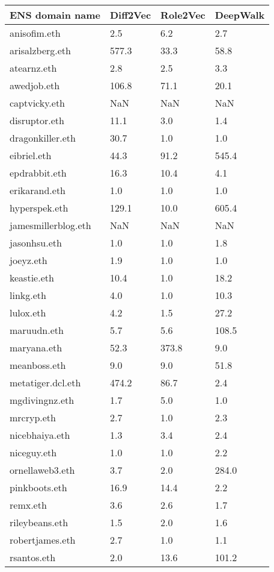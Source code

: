 \documentclass[12pt,a4paper,titlepage,oneside,english]{article}
\begin{document}
\begin{table}[h!]
\scriptsize
  \centering
  \begin{tabular}{llll}
    \hline
	\textbf{ENS domain name} & \textbf{Diff2Vec} & \textbf{Role2Vec} & \textbf{DeepWalk} \\
	\hline
	anisofim.eth & 2.5 & 6.2 & 2.7 \\
	arisalzberg.eth & 577.3 & 33.3 & 58.8 \\
	atearnz.eth & 2.8 & 2.5 & 3.3 \\
	awedjob.eth & 106.8 & 71.1 & 20.1 \\
	captvicky.eth & NaN & NaN & NaN \\
	disruptor.eth & 11.1 & 3.0 & 1.4 \\
	dragonkiller.eth & 30.7 & 1.0 & 1.0 \\
	eibriel.eth & 44.3 & 91.2 & 545.4 \\
	epdrabbit.eth & 16.3 & 10.4 & 4.1 \\
	erikarand.eth & 1.0 & 1.0 & 1.0 \\
	hyperspek.eth & 129.1 & 10.0 & 605.4 \\
	jamesmillerblog.eth & NaN & NaN & NaN \\
	jasonhsu.eth & 1.0 & 1.0 & 1.8 \\
	joeyz.eth & 1.9 & 1.0 & 1.0 \\
	keastie.eth & 10.4 & 1.0 & 18.2 \\
	linkg.eth & 4.0 & 1.0 & 10.3 \\
	lulox.eth & 4.2 & 1.5 & 27.2 \\
	maruudn.eth & 5.7 & 5.6 & 108.5 \\
	maryana.eth & 52.3 & 373.8 & 9.0 \\
	meanboss.eth & 9.0 & 9.0 & 51.8 \\
	metatiger.dcl.eth & 474.2 & 86.7 & 2.4 \\
	mgdivingnz.eth & 1.7 & 5.0 & 1.0 \\
	mrcryp.eth & 2.7 & 1.0 & 2.3 \\
	nicebhaiya.eth & 1.3 & 3.4 & 2.4 \\
	niceguy.eth & 1.0 & 1.0 & 2.2 \\
	ornellaweb3.eth & 3.7 & 2.0 & 284.0 \\
	pinkboots.eth & 16.9 & 14.4 & 2.2 \\
	remx.eth & 3.6 & 2.6 & 1.7 \\
	rileybeans.eth & 1.5 & 2.0 & 1.6 \\
	robertjames.eth & 2.7 & 1.0 & 1.1 \\
	rsantos.eth & 2.0 & 13.6 & 101.2 \\

\end{tabular}
\end{table}
\end{document}
